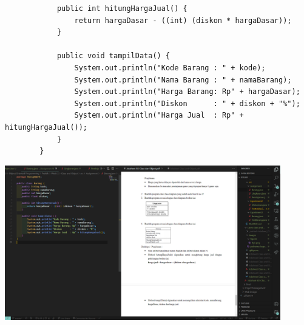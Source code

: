 \documentclass[12pt,titlepage]{article}
\begin{document}
\begin{enumerate}
\begin{verbatim}
            public int hitungHargaJual() {
                return hargaDasar - ((int) (diskon * hargaDasar));
            }

            public void tampilData() {
                System.out.println("Kode Barang : " + kode);
                System.out.println("Nama Barang : " + namaBarang);
                System.out.println("Harga Barang: Rp" + hargaDasar);
                System.out.println("Diskon      : " + diskon + "%");
                System.out.println("Harga Jual  : Rp" + hitungHargaJual());
            }
        }
    \end{verbatim}
    \includegraphics[width=0.9\textwidth]{images/figures/fig4.png}
\end{enumerate}
\end{document}
